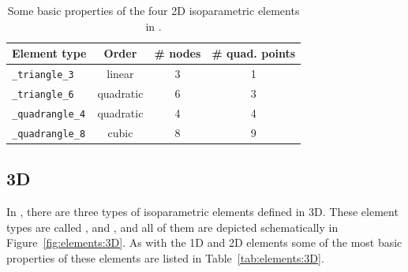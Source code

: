 \begin{table}[!htb]
\begin{center}
\begin{tabular}{l|ccc}
\toprule
Element type & Order & \# nodes & \# quad. points \\
\midrule
\texttt{\_triangle\_3} & linear & 3 & 1 \\
\texttt{\_triangle\_6} & quadratic & 6 & 3 \\
\hline
\texttt{\_quadrangle\_4} & quadratic & 4 & 4 \\
\texttt{\_quadrangle\_8} & cubic & 8 & 9 \\
\bottomrule
\end{tabular}
\end{center}
\caption{Some basic properties of the four 2D isoparametric elements in \akantu.}
\label{tab:elements:2D}
\end{table}

\subsection*{3D}

In \akantu, there are three types of isoparametric elements defined in 3D. These element types are called ,  and , and all of them are depicted schematically in Figure~\ref{fig:elements:3D}. As with the 1D and 2D elements some of the most basic properties of these elements are listed in Table~\ref{tab:elements:3D}.

